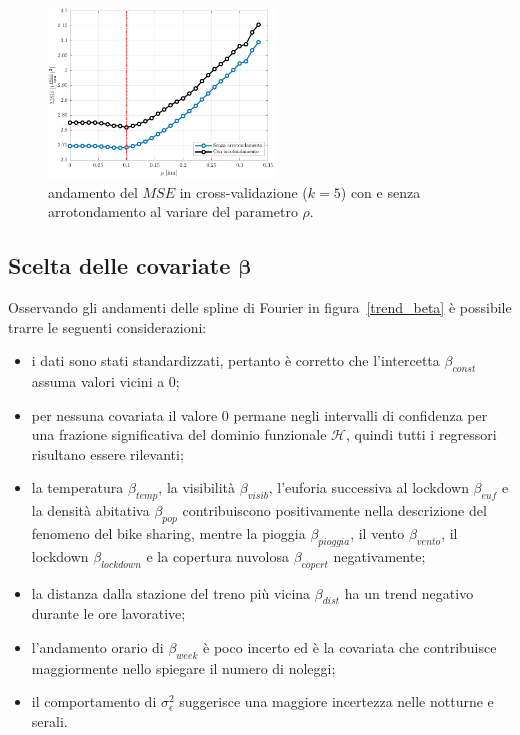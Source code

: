 \begin{figure}[htpb]
	\centering
	\includegraphics[height=170px]{Immagini/4. Caso di studio/Cross_validazione/MSE_rho_full_focus}
	\caption[Andamento del $MSE$ in cross-validazione con e senza arrotondamento al variare del parametro $\rho$]{andamento del $MSE$ in cross-validazione ($k=5$) con e senza arrotondamento al variare del parametro $\rho$.}
	\label{MSE_cv}
\end{figure}

\subsection{Scelta delle covariate $\boldsymbol{\beta}$}
Osservando gli andamenti delle spline di Fourier in figura~\ref{trend_beta} è possibile trarre le seguenti considerazioni:
\begin{itemize}
	\item i dati sono stati standardizzati, pertanto è corretto che l'intercetta $\beta_{const}$ assuma valori vicini a \num{0};
	\item per nessuna covariata il valore \num{0} permane negli intervalli di confidenza per una frazione significativa del dominio funzionale $\mathcal{H}$, quindi tutti i regressori risultano essere rilevanti;
	\item la temperatura $\beta_{temp}$, la visibilità $\beta_{visib}$, l'euforia successiva al lockdown $\beta_{euf}$ e la densità abitativa $\beta_{pop}$ contribuiscono positivamente nella descrizione del fenomeno del bike sharing, mentre la pioggia $\beta_{pioggia}$, il vento $\beta_{vento}$, il lockdown $\beta_{lockdown}$ e la copertura nuvolosa $\beta_{copert}$ negativamente;
	\item la distanza dalla stazione del treno più vicina $\beta_{dist}$ ha un trend negativo durante le ore lavorative;
	\item l'andamento orario di $\beta_{week}$ è poco incerto ed è la covariata che contribuisce maggiormente nello spiegare il numero di noleggi;
	\item il comportamento di $\sigma_\epsilon^2$ suggerisce una maggiore incertezza nelle notturne e serali.
\end{itemize}

